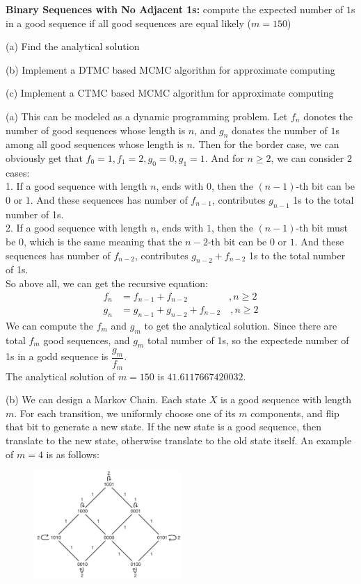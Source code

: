 \begin{homeworkProblem}

\textbf{Binary Sequences with No Adjacent 1s:} compute the expected number of $1$s in a good sequence if all good sequences are equal likely ($m=150$)

(a) Find the analytical solution

(b) Implement a DTMC based MCMC algorithm for approximate computing

(c) Implement a CTMC based MCMC algorithm for approximate computing

\solution

(a) This can be modeled as a dynamic programming problem. Let $f_n$ donotes the number of good sequences whose length is $n$, and $g_n$ donates the number of $1$s among all good sequences whose length is $n$. Then for the border case, we can obviously get that $f_0=1, f_1=2, g_0=0, g_1=1$. And for $n\geq 2$, we can consider $2$ cases: \\
1. If a good sequence with length $n$, ends with $0$, then the $(n-1)$-th bit can be $0$ or $1$. And these sequences has number of $f_{n-1}$, contributes $g_{n-1}$ 1s to the total number of 1s. \\
2. If a good sequence with length $n$, ends with $1$, then the $(n-1)$-th bit must be $0$, which is the same meaning that the $n-2$-th bit can be $0$ or $1$. And these sequences has number of $f_{n-2}$, contributes $g_{n-2}+f_{n-2}$ 1s to the total number of 1s.\\
So above all, we can get the recursive equation:
\begin{align*}
f_n &= f_{n-1} + f_{n-2} \qquad\qquad\ ,n\geq 2 \\
g_n &= g_{n-1} + g_{n-2} + f_{n-2} \quad ,n\geq 2
\end{align*}
We can compute the $f_m$ and $g_m$ to get the analytical solution. Since there are total $f_m$ good sequences, and $g_m$ total number of 1s, so the expectede number of 1s in a godd sequence is $\dfrac{g_m}{f_m}$.
\\
The analytical solution of $m = 150$ is $41.6117667420032$.

(b) We can design a Markov Chain. Each state $X$ is a good sequence with length $m$. For each transition, we uniformly choose one of its $m$ components, and flip that bit to generate a new state. If the new state is a good sequence, then translate to the new state, otherwise translate to the old state itself. An example of $m=4$ is as follows:
\begin{figure}[h]
    \centering
    \includegraphics[width=0.5\textwidth]{./figure/p1/chain.png}
\end{figure}


\end{homeworkProblem}
